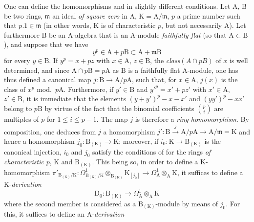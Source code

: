 \begin{remark}[22.4.8]
\label{0.22.4.8}
One can define the homomorphisms  and  in slightly different conditions.
Let $\mathrm{A}$, $\mathrm{B}$ be two rings, $\mathfrak{m}$ an ideal \emph{of square zero} in $\mathrm{A}$, $\mathrm{K}=\mathrm{A}/\mathfrak{m}$, $p$ a prime number such that $p.1\in\mathfrak{m}$ (in other words, $\mathrm{K}$ is of characteristic $p$, but not necessarily $\mathrm{A}$).
Let furthermore $\mathrm{B}$ be an $\mathrm{A}$-algebra that is an $\mathrm{A}$-module \emph{faithfully flat} (so that $\mathrm{A}\subset\mathrm{B}$), and suppose that we have
\[
\label{0.22.4.8.1}
  y^p\in\mathrm{A}+p\mathrm{B}\subset\mathrm{A}+\mathfrak{m}\mathrm{B}
  \tag{22.4.8.1}
\]
for every $y\in\mathrm{B}$.
If $y^p=x+pz$ with $x\in\mathrm{A}$, $z\in\mathrm{B}$, the \emph{class}$(A\cap pB)$ of $x$ is well determined, and since $\mathrm{A}\cap p\mathrm{B}=p\mathrm{A}$ as $\mathrm{B}$ is a faithfully flat $\mathrm{A}$-module, one has thus defined a canonical map $j:\mathrm{B}\to\mathrm{A}/p\mathrm{A}$, such that, for $x\in\mathrm{A}$, $j(x)$ is the class of $x^p$ mod.~$p\mathrm{A}$.
Furthermore, if $y'\in\mathrm{B}$ and $y'^p=x'+pz'$ with $x'\in\mathrm{A}$, $z'\in\mathrm{B}$, it is immediate that the elements $(y+y')^p-x-x'$ and $(yy')^p-xx'$ belong to $p\mathrm{B}$ by virtue of the fact that the binomial coefficients $\binom{p}{i}$ are multiples of $p$ for $1\leq i\leq p-1$.
The map $j$ is therefore a \emph{ring homomorphism}.
By composition, one deduces from $j$ a homomorphism $j':\mathrm{B}\xrightarrow{j}\mathrm{A}/p\mathrm{A}\to\mathrm{A}/\mathfrak{m}=\mathrm{K}$ and hence a homomorphism $j_0:\mathrm{B}_{(\mathrm{K})}\to\mathrm{K}$; moreover, if $i_0:\mathrm{K}\to\mathrm{B}_{(\mathrm{K})}$ is the canonical injection, $i_0$ and $j_0$ satisfy the conditions of  for the rings \emph{of characteristic} $p$, $\mathrm{K}$ and $\mathrm{B}_{(\mathrm{K})}$.
This being so, in order to define a $\mathrm{K}$-homomorphism $\pi'_{\mathrm{B}_{(\mathrm{K})}/\mathrm{K}}:\Omega^1_{\mathrm{B}_{(\mathrm{K})}/\mathrm{K}}\otimes_{\mathrm{B}_{(\mathrm{K})}}\mathrm{K}_{[j_0]}\to\Omega^1_\mathrm{A}\otimes_\mathrm{A}\mathrm{K}$, it suffices  to define a $\mathrm{K}$-\emph{derivation}
\[
\label{0.22.4.8.2}
  \mathrm{D}_0:\mathrm{B}_{(\mathrm{K})}\to\Omega^1_\mathrm{A}\otimes_\mathrm{A}\mathrm{K}
  \tag{22.4.8.2}
\]
where the second member is considered as a $\mathrm{B}_{(\mathrm{K})}$-module by means of $j_0$.
For this, it suffices to define an $\mathrm{A}$-\emph{derivation}
\[
\]
\end{remark}
